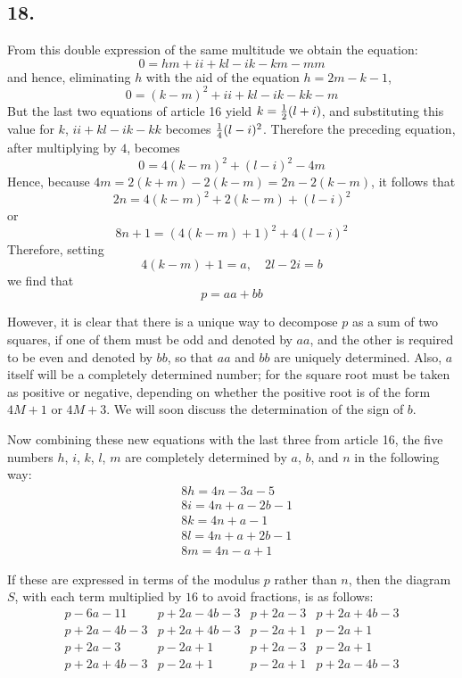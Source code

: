 \documentclass[twoside,12pt]{memoir}
\let\oldfrac\frac
\def\frac#1#2{\mathchoice{\tfrac{#1}{#2}}{\oldfrac{#1}{#2}}{\genfrac{}{}{}{2}{#1}{#2\mathstrut}}{\genfrac{}{}{}{3}{#1}{#2\mathstrut}}}
\begin{document}
\subsection*{18.}

From this double expression of the same multitude we obtain the equation:
\[0=h m+i i+k l-i k-k m-m m\]
and hence, eliminating \(h\) with the aid of the equation \(h=2 m-k-1\),
\[0=(k-m)^{2}+i i+k l-i k-k k-m\]
But the last two equations of article 16 yield \(k=\frac{1}{2}(l+i)\), and substituting this value for \(k\), \(i i+k l-i k-k k\) becomes \(\frac{1}{4}(l-i)^{2}\).  Therefore the preceding equation, after multiplying by \(4\), becomes
\[0=4(k-m)^{2}+(l-i)^{2}-4 m\]
Hence, because \(4 m=2(k+m)-2(k-m)=2 n-2(k-m)\), it follows that
\[2 n=4(k-m)^{2}+2(k-m)+(l-i)^{2}\]
or
\[8 n+1=(4(k-m)+1)^{2}+4(l-i)^{2}\]
Therefore, setting
\[4(k-m)+1=a,\quad 2 l-2 i=b\]
we find that
\[p=a a+b b\]

However, it is clear that there is a unique way to decompose \(p\) as a sum of two squares, if one of them must be odd and denoted by \(a a\), and the other is required to be even and denoted by \(b b\), so that \(a a\) and \(b b\) are uniquely determined.  Also, \(a\) itself will be a completely determined number; for the square root must be taken as positive or negative, depending on whether the positive root is of the form \(4 M+1\) or \(4 M+3\). We will soon discuss the determination of the sign of \(b\).

Now combining these new equations with the last three from article 16, the five numbers \(h\), \(i\), \(k\), \(l\), \(m\) are completely determined by \(a\), \(b\), and \(n\) in the following way:\pagebreak%
\[\begin{aligned}
& 8 h=4 n-3 a-5 \\
& 8 i=4 n+a-2 b-1 \\
& 8 k=4 n+a-1 \\
& 8 l=4 n+a+2 b-1 \\
& 8 m=4 n-a+1
\end{aligned}\]

If these are expressed in terms of the modulus \(p\) rather than \(n\), then the diagram \({S}\), with each term multiplied by \(16\) to avoid fractions, is as follows:
\[\begin{array}{l|l|l|l}
p-6 a-11 & p+2 a-4 b-3 & p+2 a-3 & p+2 a+4 b-3 \\
p+2 a-4 b-3 & p+2 a+4 b-3 & p-2 a+1 & p-2 a+1 \\
p+2 a-3 & p-2 a+1 & p+2 a-3 & p-2 a+1 \\
p+2 a+4 b-3 & p-2 a+1 & p-2 a+1 & p+2 a-4 b-3
\end{array}\]
\end{document}
